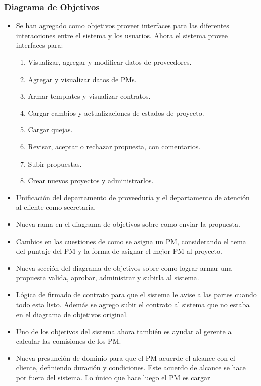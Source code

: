 \documentclass{article}
\theoremstyle{definition}
\theoremstyle{remark}
\begin{document}
\subsubsection{Diagrama de Objetivos}
\begin{itemize}
    \item Se han agregado como objetivos proveer interfaces para las diferentes interacciones entre el sistema y los usuarios. Ahora el sistema provee interfaces para:
    \begin{enumerate}
        \item Visualizar, agregar y modificar datos de proveedores.
        \item Agregar y visualizar datos de PMs.
        \item Armar templates y visualizar contratos.
        \item Cargar cambios y actualizaciones de estados de proyecto.
        \item Cargar quejas.
        \item Revisar, aceptar o rechazar propuesta, con comentarios.
        \item Subir propuestas.
        \item Crear nuevos proyectos y administrarlos.
    \end{enumerate}
    \item Unificación del departamento de proveeduría y el departamento de atención al cliente como secretaria.
    \item Nueva rama en el diagrama de objetivos sobre como enviar la propuesta.
    \item Cambios en las cuestiones de como se asigna un PM, considerando el tema del puntaje del PM y la forma de asignar el mejor PM al proyecto.
    \item Nueva sección del diagrama de objetivos sobre como lograr armar una propuesta valida, aprobar, administrar y subirla al sistema.
    \item Lógica de firmado de contrato para que el sistema le avise a las partes cuando todo esta listo. Además se agrego subir el contrato al sistema que no estaba en el diagrama de objetivos original.
    \item Uno de los objetivos del sistema ahora también es ayudar al gerente a calcular las comisiones de los PM. 
    \item Nueva presunción de dominio para que el PM acuerde el alcance con el cliente, definiendo duración y condiciones. Este acuerdo de alcance se hace por fuera del sistema. Lo único que hace luego el PM es cargar 
\end{itemize}
\end{document}
